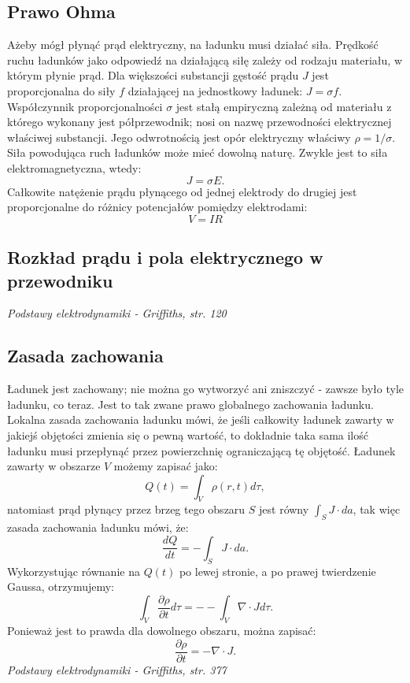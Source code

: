\documentclass{article}
\begin{document}
\subsection{Prawo Ohma}
Ażeby mógł płynąć prąd elektryczny, na ładunku musi działać siła. Prędkość ruchu ładunków jako odpowiedź na działającą siłę zależy od rodzaju materiału, w którym płynie prąd. Dla większości substancji gęstość prądu $J$ jest proporcjonalna do siły $f$ działającej na jednostkowy ładunek: $J=\sigma f$. \\
Współczynnik proporcjonalności $\sigma$ jest stałą empiryczną zależną od materiału z którego wykonany jest półprzewodnik; nosi on nazwę przewodności elektrycznej właściwej substancji. Jego odwrotnością jest opór elektryczny właściwy $\rho=1/\sigma$. Siła powodująca ruch ładunków może mieć dowolną naturę. Zwykle jest to siła elektromagnetyczna, wtedy: 
\begin{equation*}
    J=\sigma E.
\end{equation*}
Całkowite natężenie prądu płynącego od jednej elektrody do drugiej jest proporcjonalne do różnicy potencjałów pomiędzy elektrodami:
\begin{equation*}
    V=IR
\end{equation*}

\subsection{Rozkład prądu i pola elektrycznego w przewodniku}
\textit{Podstawy elektrodynamiki - Griffiths, str. 120}

\subsection{Zasada zachowania}

Ładunek jest zachowany; nie można go wytworzyć ani zniszczyć - zawsze było tyle ładunku, co teraz. Jest to tak zwane prawo globalnego zachowania ładunku. Lokalna zasada zachowania ładunku mówi, że jeśli całkowity ładunek zawarty w jakiejś objętości zmienia się o pewną wartość, to dokładnie taka sama ilość ładunku musi przepłynąć przez powierzchnię ograniczającą tę objętość. Ładunek zawarty w obszarze $V$ możemy zapisać jako:
\begin{equation*}
    Q(t) = \int_V \rho(r,t) d\tau,
\end{equation*}
natomiast prąd płynący przez brzeg tego obszaru $S$ jest równy $\int_S J\cdot da$, tak więc zasada zachowania ładunku mówi, że:
\begin{equation*}
    \frac{dQ}{dt} = -\int_S J \cdot da.
\end{equation*}
Wykorzystując równanie na $Q(t)$ po lewej stronie, a po prawej twierdzenie Gaussa, otrzymujemy:
\begin{equation*}
    \int_V \frac{\partial \rho}{\partial t} d\tau = --\int_V \nabla \cdot J d\tau. 
\end{equation*}
Ponieważ jest to prawda dla dowolnego obszaru, można zapisać:
\begin{equation*}
    \frac{\partial \rho}{\partial t} = - \nabla \cdot J . 
\end{equation*}
\textit{Podstawy elektrodynamiki - Griffiths, str. 377}
\end{document}
